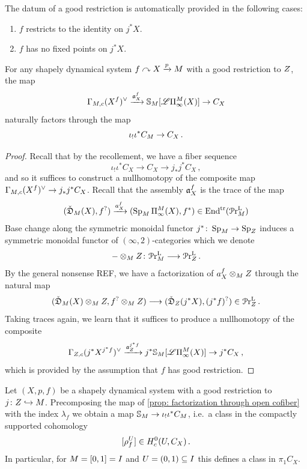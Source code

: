 \begin{exam}
The datum of a good restriction is automatically provided in the
following cases:
    \begin{enumerate}
        \item $f$ restricts to the identity on $j^*X$. 
        \item $f$ has no fixed points on $j^*X$.
    \end{enumerate}
\end{exam}

\begin{prop}\label{prop: factorization through open cofiber}
For any shapely dynamical system $f\curvearrowright X\xrightarrow{p} M$ with a good restriction to $Z$, the map 
    \[ \pbmsec{X^f}{\base}\xrightarrow{\ass_{X}^{f}}
    \SS_{\base}[\cL\ani{X}[\base]]\to C_{X}\]
    naturally factors through the map 
    \[ \iota_!\iota^*C_{M}\to C_{X}\,.\]
\end{prop}
\begin{proof}
    Recall that by the recollement, we have a fiber sequence 
    \[ \iota_!\iota^*C_{X} \to C_{X} \to j_*j^*C_{X}\,,\]
    and so it suffices to construct a nullhomotopy of the composite 
    map $\Gamma_{M,c}(X^f)^{\vee} \to j_*j^*C_{X}$. 
    Recall that the assembly $\mathfrak{a}_{X}^f$ is the trace of the map
    \[(\pcoShat{\base}{X},f^?)\xrightarrow{a_X^f} (\pSp{\base}{\ani{X}[\base]},f^*)
    \in \Endtrl(\pPrlf{\base})\]
    Base change along the symmetric monoidal functor $j^*\colon \operatorname{Sp}_{M}\to \operatorname{Sp}_{Z}$ induces a symmetric monoidal functor
    of $(\infty,2)$-categories which we denote 
    \[ -\otimes_{M} Z \colon \mathcal{P}\mathrm{r}^{\mathrm{L}}_{M} \longrightarrow \mathcal{P}\mathrm{r}^{\mathrm{L}}_{Z}\,.\]
    By the general nonsense REF, we have a factorization of 
    $a_{X}^{f} \otimes_{M} Z$ through the natural map 
    \[(\check{\mathfrak{D}}_{M}(X)\otimes_{M} Z, f^?\otimes_{M}Z) 
    \longrightarrow (\check{\mathfrak{D}}_{Z}(j^*X), (j^*f)^?) \in \mathcal{P}\mathrm{r}^{\mathrm{L}}_{Z}\,.\]
    Taking traces again, we learn that it suffices to produce a 
    nullhomotopy of the composite
    \[ \pbmsec{j^*X^{j^*f}}{\closed}\xrightarrow{\ass_{\closed}^{j^*f}}
    j^* \SS_{\base}[\cL \ani{X}[\base]]\to j^* C_X\,,\]
    which is provided by the assumption that $f$ has good restriction.
\end{proof} 

\begin{cons}
  Let $(X,p,f)$ be a shapely dynamical system with a good restriction 
  to $j\colon Z \hookrightarrow M$. Precomposing the map 
  of \cref{prop: factorization through open cofiber} with the index
  $\lambda_f$ we obtain a map $\mathbb{S}_M \to \iota_!\iota^*C_{M}$,
  i.e.~a class in the compactly supported cohomology 
  \[[\rho_f^U] \in H^0_{c}(U, C_X)\,.\]
  In particular, for $M= [0,1]=I$ and $U=(0,1)\subseteq I$ this defines a class in $\pi_1C_{X}$. 
\end{cons}

